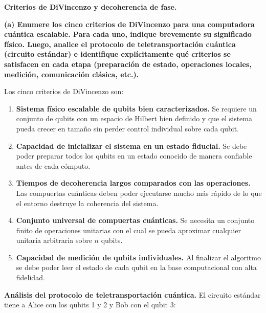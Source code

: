 {\bfseries Criterios de DiVincenzo y decoherencia de fase.}

{\bfseries (a) Enumere los cinco criterios de DiVincenzo para una computadora cuántica escalable. Para cada uno, indique brevemente su significado físico. Luego, analice el protocolo de teletransportación cuántica (circuito estándar) e identifique explícitamente qué criterios se satisfacen en cada etapa (preparación de estado, operaciones locales, medición, comunicación clásica, etc.).}

Los cinco criterios de DiVincenzo son:

\begin{enumerate}
    \item \textbf{Sistema físico escalable de qubits bien caracterizados.} Se requiere un conjunto de qubits con un espacio de Hilbert bien definido y que el sistema pueda crecer en tamaño sin perder control individual sobre cada qubit.

    \item \textbf{Capacidad de inicializar el sistema en un estado fiducial.} Se debe poder preparar todos los qubits en un estado conocido de manera confiable antes de cada cómputo.

    \item \textbf{Tiempos de decoherencia largos comparados con las operaciones.} Las compuertas cuánticas deben poder ejecutarse mucho más rápido de lo que el entorno destruye la coherencia del sistema.

    \item \textbf{Conjunto universal de compuertas cuánticas.} Se necesita un conjunto finito de operaciones unitarias con el cual se pueda aproximar cualquier unitaria arbitraria sobre $n$ qubits.

    \item \textbf{Capacidad de medición de qubits individuales.} Al finalizar el algoritmo se debe poder leer el estado de cada qubit en la base computacional con alta fidelidad.
\end{enumerate}

\textbf{Análisis del protocolo de teletransportación cuántica.} El circuito estándar tiene a Alice con los qubits 1 y 2 y Bob con el qubit 3:

